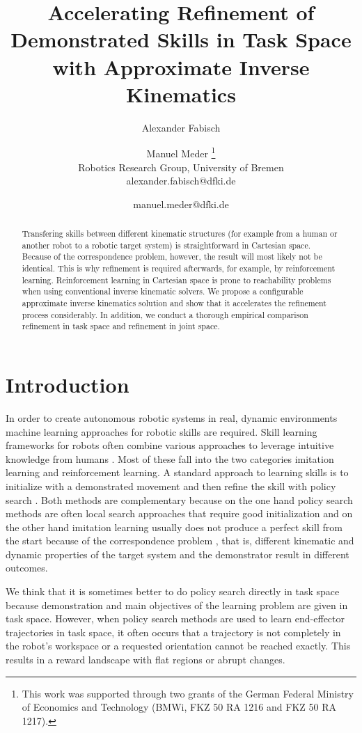 \documentclass{article}
\title{
Accelerating Refinement of Demonstrated Skills in Task Space with
Approximate Inverse Kinematics}
\author{Alexander Fabisch \and Manuel Meder
\thanks{
This work was supported through two grants of the German Federal Ministry of
Economics and Technology (BMWi, FKZ 50 RA 1216 and FKZ 50 RA 1217).}\\
Robotics Research Group, University of Bremen\\
alexander.fabisch@dfki.de \and manuel.meder@dfki.de}
\begin{document}
\maketitle

\begin{abstract}
Transfering skills between different kinematic structures
(for example from a human or another robot to a robotic target system)
is straightforward in Cartesian space.
Because of the correspondence problem, however, the result will most likely
not be identical.
This is why refinement is required afterwards, for example,
by reinforcement learning. Reinforcement learning %
in Cartesian space is prone to reachability problems when using conventional
inverse kinematic solvers. We propose a configurable approximate inverse
kinematics solution and show that it accelerates the refinement process
considerably.
In addition, we conduct a thorough empirical comparison refinement in task
space and refinement in joint space.
\end{abstract}

\section{Introduction}

In order to create autonomous robotic systems in real, dynamic environments
machine learning approaches for robotic skills are required.
Skill learning frameworks for robots often combine various approaches to
leverage intuitive knowledge from humans \cite{Peters2012,Metzen2013}.
Most of these fall into the two categories imitation learning and reinforcement
learning. A standard approach to learning skills is to initialize with
a demonstrated movement and then refine the skill with policy search
\cite{Kober2012,Deisenroth2013}.
Both methods are complementary because on the one hand policy search methods
are often local search approaches that require good initialization and
on the other hand imitation learning usually does not produce a perfect
skill from the start because of the correspondence problem \cite{Argall2009},
that is, different kinematic and dynamic properties of the target system and
the demonstrator result in different outcomes.

We think that it is sometimes better to do policy search directly in task
space because demonstration and main objectives of the learning problem are
given in task space.
However, when policy search methods are used to learn end-effector
trajectories in task space, it often occurs that a trajectory is not
completely in the robot's workspace or a requested orientation cannot
be reached exactly. This results in a reward landscape with flat regions
or abrupt changes.
\end{document}
